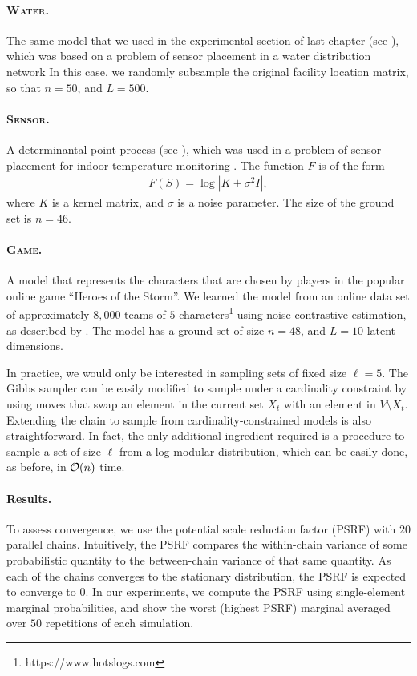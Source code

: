 \paragraph{\textsc{Water}.} The same \flid{} model that we used in the experimental section of last chapter (see ), which was based on a problem of sensor placement in a water distribution network \citep{krause08}
In this case, we randomly subsample the original facility location matrix, so that $n = 50$, and $L = 500$.

\paragraph{\textsc{Sensor}.} A determinantal point process (see ), which was used in a problem of sensor placement for indoor temperature monitoring \citep{guestrin05}.
The function $F$ is of the form
\begin{align*}
F(S) = \log |K + \sigma^2 I|,
\end{align*}
where $K$ is a kernel matrix, and $\sigma$ is a noise parameter.
The size of the ground set is $n = 46$.

\paragraph{\textsc{Game}.} A \flid{} model that represents the characters that are chosen by players in the popular online game ``Heroes of the Storm''.
We learned the model from an online data set of approximately $8,000$ teams of $5$ characters\footnote{https://www.hotslogs.com} using noise-contrastive estimation, as described by \cite{tschiatschek16}.
The model has a ground set of size $n = 48$, and $L = 10$ latent dimensions.

In practice, we would only be interested in sampling sets of fixed size $\ell = 5$.
The Gibbs sampler can be easily modified to sample under a cardinality constraint by using moves that swap an element in the current set $X_t$ with an element in $V \setminus X_t$.
Extending the \Ms{} chain to sample from cardinality-constrained models is also straightforward.
In fact, the only additional ingredient required is a procedure to sample a set of size $\ell$ from a log-modular distribution, which can be easily done, as before, in $\mathcal{O}(n)$ time.

\paragraph{Results.}
To assess convergence, we use the potential scale reduction factor (PSRF) \citep{brooks11} with $20$ parallel chains.
Intuitively, the PSRF compares the within-chain variance of some probabilistic quantity to the between-chain variance of that same quantity.
As each of the chains converges to the stationary distribution, the PSRF is expected to converge to $0$.
In our experiments, we compute the PSRF using single-element marginal probabilities, and show the worst (highest PSRF) marginal averaged over $50$ repetitions of each simulation.

